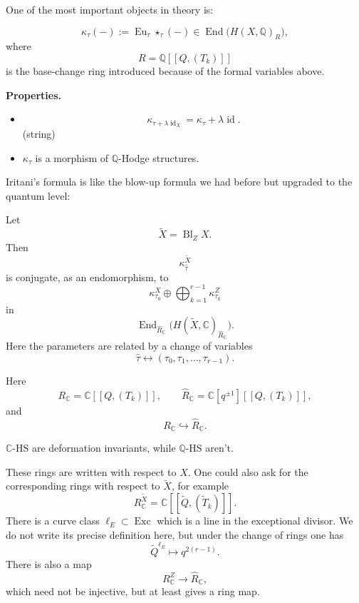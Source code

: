 \noindent
One of the most important objects in theory
is:

\begin{definition}
\label{definition-statement2}
\[
\kappa_\tau(-)
:=
\operatorname{Eu}_\tau\star_\tau(-)
\in
\operatorname{End}
\bigl(H(X,\mathbb{Q})_R\bigr),
\]
where
\[
R=\mathbb{Q}[[Q,(T_k)]]
\]
is the base-change ring introduced
because of the formal variables above.
\end{definition}

\medskip\noindent
{\bf Properties.}

\begin{itemize}
\item
\[
\kappa_{\tau+\lambda\operatorname{id}_X}
=
\kappa_\tau+\lambda\operatorname{id}.
\]
(string)
\item $\kappa_\tau$ is a morphism of
$\mathbb{Q}$-Hodge structures.
\end{itemize}

\noindent
Iritani's formula is like the blow-up formula
we had before but upgraded to the quantum
level:

\begin{theorem}[Iritani]
\label{theorem-let-x7}
Let
\[
\widetilde X=\operatorname{Bl}_Z X.
\]
Then
\[
\kappa_{\widehat\tau}^{\widetilde X}
\]
is conjugate, as an endomorphism, to
\[
\kappa_{\tau_0}^X
\oplus
\bigoplus_{k=1}^{r-1}
\kappa_{\tau_k}^Z
\]
in
\[
\operatorname{End}_{\widehat R_{\mathbb{C}}}
\bigl(
H(\widetilde X,\mathbb{C})_
{\widehat R_{\mathbb{C}}}
\bigr).
\]
Here the parameters are related by a
change of variables
\[
\widehat\tau
\longleftrightarrow
(\tau_0,\tau_1,\ldots,\tau_{r-1}).
\]
\end{theorem}

\noindent
Here
\[
R_{\mathbb{C}}
=
\mathbb{C}[[Q,(T_k)]],
\qquad
\widehat R_{\mathbb{C}}
=
\mathbb{C}[q^{\pm 1}][[Q,(T_k)]],
\]
and
\[
R_{\mathbb{C}}
\hookrightarrow
\widehat R_{\mathbb{C}}.
\]

\begin{remark}
\label{remark-def-invariance}
$\mathbb{C}$-HS are deformation invariants,
while $\mathbb{Q}$-HS aren't.
\end{remark}

\noindent
These rings are written with respect
to $X$.
One could also ask for the
corresponding rings with respect to
$\widetilde X$, for example
\[
R_{\mathbb{C}}^{\widetilde X}
=
\mathbb{C}[[\widetilde Q,
(\widetilde T_k)]].
\]
There is a curve class
$\ell_E\subset \operatorname{Exc}$
which is a line in the exceptional
divisor.
We do not write its precise definition
here, but under the change of rings one
has
\[
\widetilde Q^{\ell_E}
\longmapsto
q^{2(r-1)}.
\]
There is also a map
\[
R_{\mathbb{C}}^Z
\longrightarrow
\widehat R_{\mathbb{C}},
\]
which need not be injective, but at
least gives a ring map.

